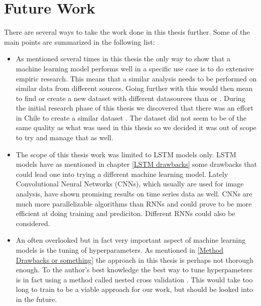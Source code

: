 \section{Future Work}
There are several ways to take the work done in this thesis further. Some of the 
main points are summarized in the following list:
\begin{itemize}
\item As mentioned several times in this thesis the only way to show that a machine learning model performs well in a specific use case is to do extensive empiric research. This means that a similar analysis needs to be performed on similar data from different sources. Going further with this would then mean to find or create a new dataset with different datasources than \cite{CAMELS_GB} or \cite{CAMELS_US}. During the initial research phase of this thesis we discovered that there was an effort in Chile to create a similar dataset \cite{CAMELS_CL}. The dataset did not seem to be of the same quality as what was used in this thesis so we decided it was out of scope to try and manage that as well.
\item The scope of this thesis work was limited to LSTM models only. LSTM models have as mentioned in chapter \ref{LSTM drawbacks} some drawbacks that could lead one into trying a different machine learning model. Lately Convolutional Neural Networks (CNNs), which usually are used for image analysis, have shown promising results on time series data as well. \citationneeded CNNs are much more parallelizable algorithms than RNNs \citationneeded and could prove to be more efficient at doing training and prediciton. Different RNNs could also be considered.
\item An often overlooked but in fact very important aspect of machine learning models is the tuning of hyperparameters. As mentioned in \ref{Method Drawbacks or something} the approach in this thesis is perhaps not thorough enough. To the author's best knowledge the best way to tune hyperpameters is in fact using a method called nested cross validation \citationneeded. This would take too long to train to be a viable approach for our work, but should be looked into in the future.
\end{itemize}
